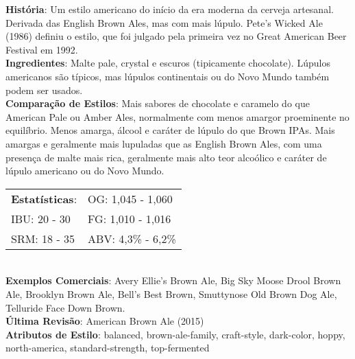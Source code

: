 \textbf{História}: Um estilo americano do início da era moderna da cerveja artesanal. Derivada das English Brown Ales, mas com mais lúpulo. Pete's Wicked Ale (1986) definiu o estilo, que foi julgado pela primeira vez no Great American Beer Festival em 1992. \\
\textbf{Ingredientes}: Malte pale, crystal e escuros (tipicamente chocolate). Lúpulos americanos são típicos, mas lúpulos continentais ou do Novo Mundo também podem ser usados. \\
\textbf{Comparação de Estilos}: Mais sabores de chocolate e caramelo do que American Pale ou Amber Ales, normalmente com menos amargor proeminente no equilíbrio. Menos amarga, álcool e caráter de lúpulo do que Brown IPAs. Mais amargas e geralmente mais lupuladas que as English Brown Ales, com uma presença de malte mais rica, geralmente mais alto teor alcoólico e caráter de lúpulo americano ou do Novo Mundo. \\
\begin{tabular}{@{}p{35mm}p{35mm}@{}}
  \textbf{Estatísticas}: & OG: 1,045 - 1,060 \\
  IBU: 20 - 30  & FG: 1,010 - 1,016 \\
  SRM: 18 - 35  & ABV: 4,3\% - 6,2\%
\end{tabular}\\
\textbf{Exemplos Comerciais}: Avery Ellie’s Brown Ale, Big Sky Moose Drool Brown Ale, Brooklyn Brown Ale, Bell’s Best Brown, Smuttynose Old Brown Dog Ale, Telluride Face Down Brown. \\
\textbf{Última Revisão}: American Brown Ale (2015) \\
\textbf{Atributos de Estilo}: balanced, brown-ale-family, craft-style, dark-color, hoppy, north-america, standard-strength, top-fermented
